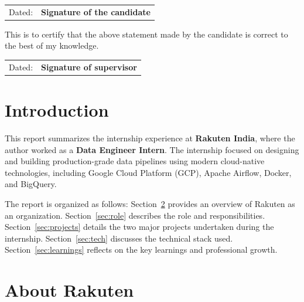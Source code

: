 \documentclass[12pt, a4paper]{article}
\begin{document}
\begin{center}
	\begin{tabular}{p{}p{}}
		Dated:  & {\bf{Signature of the candidate}} \\	
	\end{tabular}
\end{center}
\vspace{1.5cm}
\noindent This is to certify that the above statement made by the candidate is correct to the best of my knowledge.

\vspace{1.5cm}

\begin{center}
	\begin{tabular}{p{}p{}}
		Dated: & {\bf{Signature of supervisor}} \\	
	\end{tabular}
\end{center}

\tableofcontents
\newpage

\section{Introduction}
\noindent This report summarizes the internship experience at \textbf{Rakuten India}, where the author worked as a \textbf{Data Engineer Intern}. The internship focused on designing and building production-grade data pipelines using modern cloud-native technologies, including Google Cloud Platform (GCP), Apache Airflow, Docker, and BigQuery.

\noindent The report is organized as follows: Section~\ref{sec:about} provides an overview of Rakuten as an organization. Section~\ref{sec:role} describes the role and responsibilities. Section~\ref{sec:projects} details the two major projects undertaken during the internship. Section~\ref{sec:tech} discusses the technical stack used. Section~\ref{sec:learnings} reflects on the key learnings and professional growth.

\section{About Rakuten}
\label{sec:about}
\end{document}
